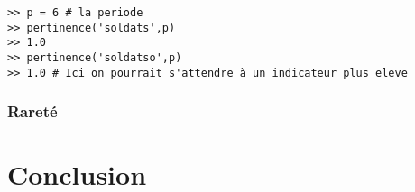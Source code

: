 \documentclass[a4paper, 11pt]{article}
\begin{document}
\begin{lstlisting}[caption={test de la fonction pertinence}]
>> p = 6 # la periode
>> pertinence('soldats',p)
>> 1.0
>> pertinence('soldatso',p)
>> 1.0 # Ici on pourrait s'attendre à un indicateur plus eleve
\end{lstlisting}

\subsubsection{Rareté}



\section{Conclusion}
\end{document}
